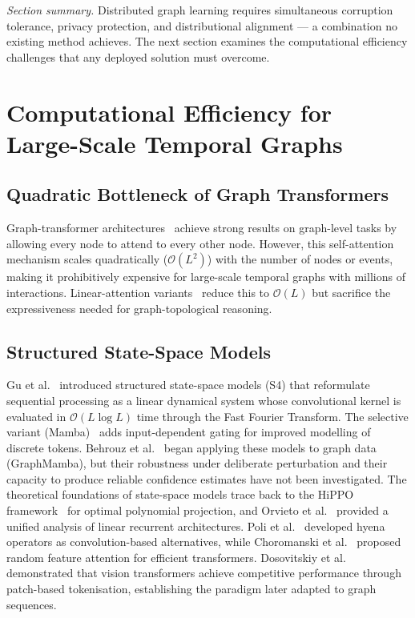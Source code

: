 \medskip
\noindent\textit{Section summary.} Distributed graph learning requires simultaneous corruption tolerance, privacy protection, and distributional alignment --- a combination no existing method achieves. The next section examines the computational efficiency challenges that any deployed solution must overcome.


\section{Computational Efficiency for Large-Scale Temporal Graphs}
\label{sec:efficiency}

\subsection{Quadratic Bottleneck of Graph Transformers}

Graph-transformer architectures~\cite{Vaswani2017,Ying2021} achieve strong results on graph-level tasks by allowing every node to attend to every other node. However, this self-attention mechanism scales quadratically ($\mathcal{O}(L^2)$) with the number of nodes or events, making it prohibitively expensive for large-scale temporal graphs with millions of interactions. Linear-attention variants~\cite{Katharopoulos2020} reduce this to $\mathcal{O}(L)$ but sacrifice the expressiveness needed for graph-topological reasoning.


\subsection{Structured State-Space Models}

Gu et al.~\cite{Gu2022} introduced structured state-space models (S4) that reformulate sequential processing as a linear dynamical system whose convolutional kernel is evaluated in $\mathcal{O}(L\log L)$ time through the Fast Fourier Transform. The selective variant (Mamba)~\cite{Dao2024} adds input-dependent gating for improved modelling of discrete tokens. Behrouz et al.~\cite{Behrouz2024graphmamba} began applying these models to graph data (GraphMamba), but their robustness under deliberate perturbation and their capacity to produce reliable confidence estimates have not been investigated. The theoretical foundations of state-space models trace back to the HiPPO framework~\cite{Gu2020hippo} for optimal polynomial projection, and Orvieto et al.~\cite{Orvieto2023} provided a unified analysis of linear recurrent architectures. Poli et al.~\cite{Poli2023} developed hyena operators as convolution-based alternatives, while Choromanski et al.~\cite{Choromanski2021,Perez2021} proposed random feature attention for efficient transformers. Dosovitskiy et al.~\cite{Dosovitskiy2021,Salvi2024} demonstrated that vision transformers achieve competitive performance through patch-based tokenisation, establishing the paradigm later adapted to graph sequences.


